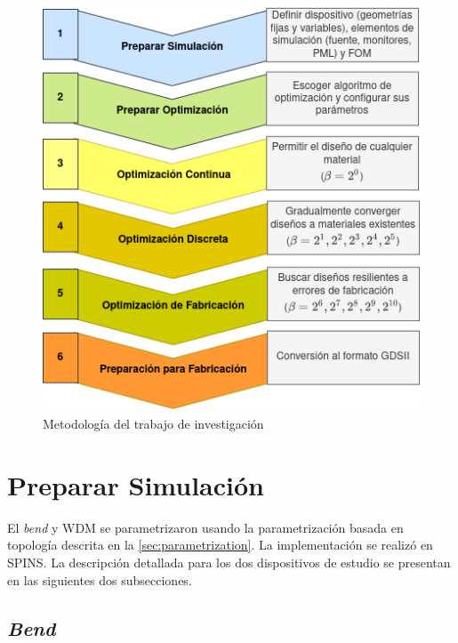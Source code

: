 \begin{figure}[ht]
  \centering
  \includegraphics[width=\textwidth]{image/proposal/pipeline.png}
  \caption{Metodología del trabajo de investigación}
  \label{fig:pipeline}
\end{figure}

\section{Preparar Simulación}

El \emph{bend} y WDM se parametrizaron usando la parametrización basada en topología descrita en la
\autoref{sec:parametrization}.
La implementación se realizó en SPINS.
La descripción detallada para los dos dispositivos de estudio se presentan en las siguientes dos subsecciones.

\subsection{\emph{Bend}}

